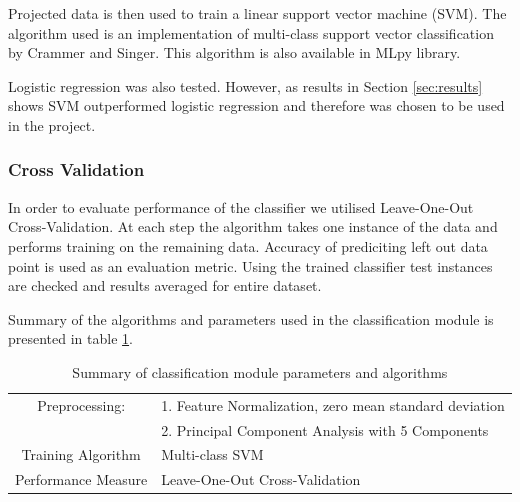 Projected data is then used to train a linear support vector machine (SVM). The algorithm used is an implementation of multi-class support vector classification by Crammer and Singer. This algorithm is also available in MLpy library.

Logistic regression was also tested. However, as results in Section \ref{sec:results} shows SVM outperformed logistic regression and therefore was chosen to be used in the project. 

\subsubsection*{Cross Validation}

In order to evaluate performance of the classifier we utilised Leave-One-Out Cross-Validation. At each step the algorithm takes one instance of the data and performs training on the remaining data. Accuracy of prediciting left out data point is used as an evaluation metric. Using the trained classifier test instances are checked and results averaged for entire dataset.

Summary of the algorithms and parameters used in the classification module is presented in table \ref{tbl:classification}.

\begin{table}
\begin{tabular}{|c|l|}
\hline 
Preprocessing: & 1.  Feature Normalization, zero mean standard deviation\\ 
& 2. Principal Component Analysis with 5 Components\\
\hline 
Training Algorithm & Multi-class SVM \\ 
\hline 
Performance Measure & Leave-One-Out Cross-Validation \\ 
\hline 

\end{tabular} 
\caption{Summary of classification module parameters and algorithms}
\label{tbl:classification}
\end{table}
